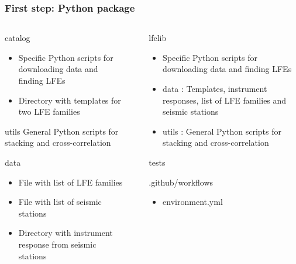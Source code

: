 \documentclass{beamer}
\begin{document}
	\begin{frame}
		\frametitle{First step: Python package}
		\scriptsize{
		\begin{columns}[c]
			\begin{column}{5cm}
				\begin{block}{catalog}
				\begin{itemize}
					\item	Specific Python scripts for downloading data and finding LFEs
					\item Directory with templates for two LFE families
				\end{itemize}
				\end{block}
				\begin{block}{utils}
				General Python scripts for stacking and cross-correlation
				\end{block}
				\begin{block}{data}
				\begin{itemize}
					\item File with list of LFE families
					\item File with list of seismic stations
					\item Directory with instrument response from seismic stations
				\end{itemize}
				\end{block}
			\end{column}
			\begin{column}{1cm}
				\centering
				\Huge\pointer
			\end{column}
			\begin{column}{5cm}
				\begin{block}{lfelib}
				\begin{itemize}
					\item Specific Python scripts for downloading data and finding LFEs
					\item \textsf{data} : Templates, instrument responses, list of LFE families and seismic stations
					\item \textsf{utils} : General Python scripts for stacking and cross-correlation
				\end{itemize}
				\end{block}
				\begin{block}{tests}
				\end{block}
				\begin{block}{.github/workflows}
				\end{block}
				\begin{itemize}
					\item environment.yml

\end{itemize}
\end{column}
\end{columns}}
\end{frame}
\end{document}
